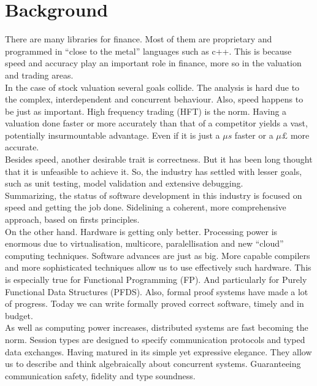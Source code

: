 \documentclass{tufte-book} %
\begin{document}
\chapter{Background} %

There are many libraries for finance. Most of them are proprietary and programmed in ``close to the metal'' languages such as c++. This is because speed and accuracy play an important role in finance, more so in the valuation and trading areas.\\

In the case of stock valuation several goals collide. The analysis is hard due to the complex, interdependent and  concurrent behaviour.  Also, speed happens to be just as important. High frequency trading (HFT) is the norm. Having a valuation done faster or more accurately than that of a competitor yields a vast, potentially insurmountable advantage. Even if it is just a $\mu s$ faster or a $\mu \pounds$ more accurate.\\

Besides speed, another desirable trait is correctness. But it has been long thought that it is unfeasible to achieve it. So, the industry has settled with lesser goals, such as unit testing, model validation and extensive debugging.\\

Summarizing, the status of software development in this industry is focused on speed and getting the job done. Sidelining a coherent, more comprehensive approach, based on firsts principles.\\

On the other hand. Hardware is getting only better.  Processing power is enormous due to virtualisation, multicore, paralellisation and new ``cloud'' computing techniques. Software advances are just as big. More capable compilers and more sophisticated techniques allow us to use effectively such hardware. This is especially true for Functional Programming (FP). And particularly for Purely Functional Data Structures (PFDS).  Also, formal proof systems have made a lot of progress.  Today we can write formally proved correct software, timely and in budget.\\

As well as computing power increases, distributed systems are fast becoming the norm. Session types are designed to specify communication protocols and typed data exchanges. Having matured in its simple yet expressive elegance. They allow us to describe and think algebraically about concurrent systems. Guaranteeing communication safety, fidelity and type soundness.\\
\end{document}
